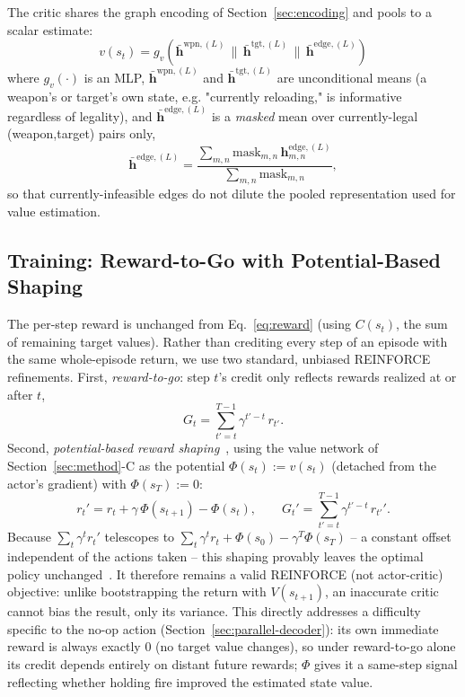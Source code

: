 \documentclass{ieeeaccess}
\begin{document}
The critic shares the graph encoding of Section~\ref{sec:encoding} and pools to a scalar estimate:
\begin{equation}
v(s_t) = g_v\!\left(\bar{\bm{h}}^{\text{wpn},(L)} \,\|\, \bar{\bm{h}}^{\text{tgt},(L)} \,\|\, \bar{\bm{h}}^{\text{edge},(L)}\right)
\end{equation}
where $g_v(\cdot)$ is an MLP, $\bar{\bm{h}}^{\text{wpn},(L)}$ and $\bar{\bm{h}}^{\text{tgt},(L)}$ are unconditional means (a weapon's or target's own state, e.g. "currently reloading," is informative regardless of legality), and $\bar{\bm{h}}^{\text{edge},(L)}$ is a \emph{masked} mean over currently-legal (weapon,target) pairs only,
\begin{equation}
\bar{\bm{h}}^{\text{edge},(L)} = \frac{\sum_{m,n} \text{mask}_{m,n} \, \bm{h}_{m,n}^{\text{edge},(L)}}{\sum_{m,n} \text{mask}_{m,n}},
\end{equation}
so that currently-infeasible edges do not dilute the pooled representation used for value estimation.

\subsection{Training: Reward-to-Go with Potential-Based Shaping}
\label{sec:training}

The per-step reward is unchanged from Eq.~\eqref{eq:reward} (using $C(s_t)$, the sum of remaining target values). Rather than crediting every step of an episode with the same whole-episode return, we use two standard, unbiased REINFORCE refinements. First, \emph{reward-to-go}: step $t$'s credit only reflects rewards realized at or after $t$,
\begin{equation}
G_t = \sum_{t'=t}^{T-1} \gamma^{t'-t}\, r_{t'}.
\end{equation}
Second, \emph{potential-based reward shaping}~\cite{ng1999shaping}, using the value network of Section~\ref{sec:method}-C as the potential $\Phi(s_t) := v(s_t)$ (detached from the actor's gradient) with $\Phi(s_T) := 0$:
\begin{equation}
r_t' = r_t + \gamma\, \Phi(s_{t+1}) - \Phi(s_t), \qquad
G_t' = \sum_{t'=t}^{T-1} \gamma^{t'-t}\, r_{t'}'.
\end{equation}
Because $\sum_t \gamma^t r_t'$ telescopes to $\sum_t \gamma^t r_t + \Phi(s_0) - \gamma^T \Phi(s_T)$ -- a constant offset independent of the actions taken -- this shaping provably leaves the optimal policy unchanged~\cite{ng1999shaping}. It therefore remains a valid REINFORCE (not actor-critic) objective: unlike bootstrapping the return with $V(s_{t+1})$, an inaccurate critic cannot bias the result, only its variance. This directly addresses a difficulty specific to the no-op action (Section~\ref{sec:parallel-decoder}): its own immediate reward is always exactly $0$ (no target value changes), so under reward-to-go alone its credit depends entirely on distant future rewards; $\Phi$ gives it a same-step signal reflecting whether holding fire improved the estimated state value.
\end{document}
